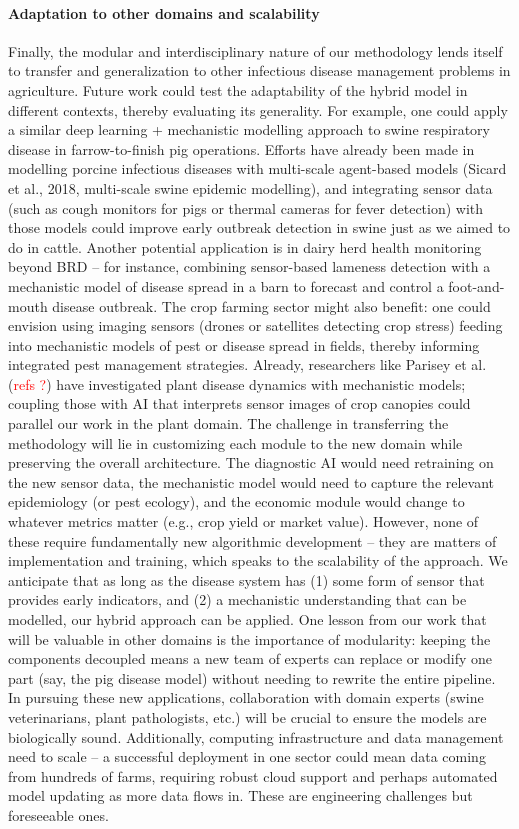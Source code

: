 \paragraph{Adaptation to other domains and scalability} Finally, the modular and interdisciplinary nature of our methodology lends itself to transfer and generalization to other infectious disease management problems in agriculture. Future work could test the adaptability of the hybrid model in different contexts, thereby evaluating its generality. For example, one could apply a similar deep learning + mechanistic modelling approach to swine respiratory disease in farrow-to-finish pig operations. Efforts have already been made in modelling porcine infectious diseases with multi-scale agent-based models (Sicard et al., 2018, multi-scale swine epidemic modelling), and integrating sensor data (such as cough monitors for pigs or thermal cameras for fever detection) with those models could improve early outbreak detection in swine just as we aimed to do in cattle. Another potential application is in dairy herd health monitoring beyond BRD – for instance, combining sensor-based lameness detection with a mechanistic model of disease spread in a barn to forecast and control a foot-and-mouth disease outbreak. The crop farming sector might also benefit: one could envision using imaging sensors (drones or satellites detecting crop stress) feeding into mechanistic models of pest or disease spread in fields, thereby informing integrated pest management strategies. Already, researchers like Parisey et al. (\textcolor{red}{refs ?}) have investigated plant disease dynamics with mechanistic models; coupling those with AI that interprets sensor images of crop canopies could parallel our work in the plant domain. The challenge in transferring the methodology will lie in customizing each module to the new domain while preserving the overall architecture. The diagnostic AI would need retraining on the new sensor data, the mechanistic model would need to capture the relevant epidemiology (or pest ecology), and the economic module would change to whatever metrics matter (e.g., crop yield or market value). However, none of these require fundamentally new algorithmic development – they are matters of implementation and training, which speaks to the scalability of the approach. We anticipate that as long as the disease system has (1) some form of sensor that provides early indicators, and (2) a mechanistic understanding that can be modelled, our hybrid approach can be applied. One lesson from our work that will be valuable in other domains is the importance of modularity: keeping the components decoupled means a new team of experts can replace or modify one part (say, the pig disease model) without needing to rewrite the entire pipeline. In pursuing these new applications, collaboration with domain experts (swine veterinarians, plant pathologists, etc.) will be crucial to ensure the models are biologically sound. Additionally, computing infrastructure and data management need to scale – a successful deployment in one sector could mean data coming from hundreds of farms, requiring robust cloud support and perhaps automated model updating as more data flows in. These are engineering challenges but foreseeable ones. 
